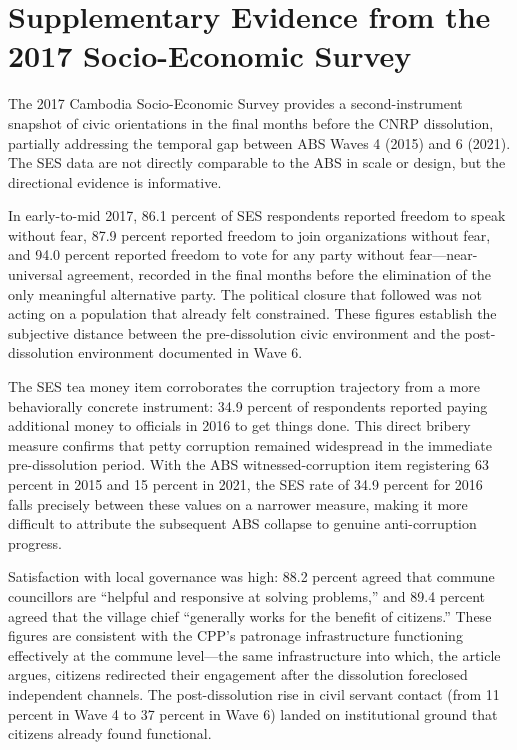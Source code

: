 \documentclass[Review,times,sageh,doublespace]{sagej}
\begin{document}
\section{Supplementary Evidence from the 2017 Socio-Economic
Survey}\label{supplementary-evidence-from-the-2017-socio-economic-survey}

The 2017 Cambodia Socio-Economic Survey provides a second-instrument
snapshot of civic orientations in the final months before the CNRP
dissolution, partially addressing the temporal gap between ABS Waves 4
(2015) and 6 (2021). The SES data are not directly comparable to the ABS
in scale or design, but the directional evidence is informative.

In early-to-mid 2017, 86.1 percent of SES respondents reported freedom
to speak without fear, 87.9 percent reported freedom to join
organizations without fear, and 94.0 percent reported freedom to vote
for any party without fear---near-universal agreement, recorded in the
final months before the elimination of the only meaningful alternative
party. The political closure that followed was not acting on a
population that already felt constrained. These figures establish the
subjective distance between the pre-dissolution civic environment and
the post-dissolution environment documented in Wave 6.

The SES tea money item corroborates the corruption trajectory from a
more behaviorally concrete instrument: 34.9 percent of respondents
reported paying additional money to officials in 2016 to get things
done. This direct bribery measure confirms that petty corruption
remained widespread in the immediate pre-dissolution period. With the
ABS witnessed-corruption item registering 63 percent in 2015 and 15
percent in 2021, the SES rate of 34.9 percent for 2016 falls precisely
between these values on a narrower measure, making it more difficult to
attribute the subsequent ABS collapse to genuine anti-corruption
progress.

Satisfaction with local governance was high: 88.2 percent agreed that
commune councillors are ``helpful and responsive at solving problems,''
and 89.4 percent agreed that the village chief ``generally works for the
benefit of citizens.'' These figures are consistent with the CPP's
patronage infrastructure functioning effectively at the commune
level---the same infrastructure into which, the article argues, citizens
redirected their engagement after the dissolution foreclosed independent
channels. The post-dissolution rise in civil servant contact (from 11
percent in Wave 4 to 37 percent in Wave 6) landed on institutional
ground that citizens already found functional.
\end{document}
